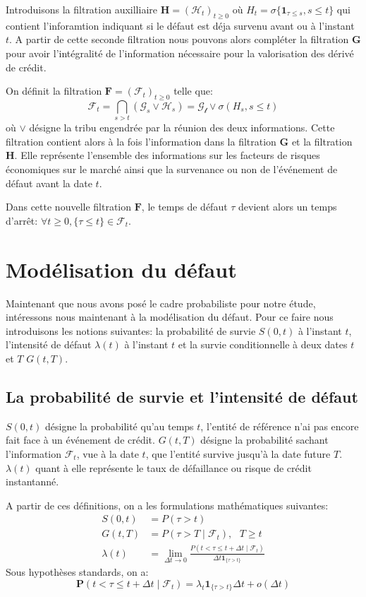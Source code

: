 Introduisons la filtration auxilliaire $\mathbf{H} = (\mathcal{H}_t)_{t \ge 0} \text{ où } H_t = \sigma\{\mathbf{1}_{\tau \le s}, s \le t\}$ qui contient l'inforamtion indiquant si le défaut est déja survenu avant ou à l'instant $t$. A partir de cette seconde filtration nous pouvons alors compléter la filtration $\mathbf{G}$ pour avoir l'intégralité de l'information nécessaire pour la valorisation des dérivé de crédit.


On définit la filtration $\mathbf{F} = (\mathcal{F}_t)_{t \ge 0}$ telle que:
$$\mathcal{F}_t = \bigcap_{s > t} (\mathcal{G}_s \lor \mathcal{H}_s) = \mathcal{G_t} \lor \sigma(H_s, s \le t)$$
où $\lor$ désigne la tribu engendrée par la réunion des deux informations. Cette filtration contient alors à la fois l'information dans la filtration $\mathbf{G}$ et la filtration $\mathbf{H}$. Elle représente l'ensemble des informations sur les facteurs de risques économiques sur le marché ainsi que la survenance ou non de l'événement de défaut avant la date $t$.

Dans cette nouvelle filtration $\mathbf{F}$, le temps de défaut $\tau$ devient alors un temps d'arrêt: $\forall t \ge 0, \{\tau \le t\} \in \mathcal{F}_t$.


\section{Modélisation du défaut}

Maintenant que nous avons posé le cadre probabiliste pour notre étude, intéressons nous maintenant à la modélisation du défaut. Pour ce faire nous introduisons les notions suivantes: la probabilité de survie $S(0, t)$ à l'instant $t$, l'intensité de défaut $\lambda(t)$ à l'instant $t$ et la survie conditionnelle à deux dates $t$ et $T$ $G(t, T)$.


\subsection{La probabilité de survie et l'intensité de défaut}

$S(0, t)$ désigne la probabilité qu'au temps $t$, l'entité de référence n'ai pas encore fait face à un événement de crédit. $G(t, T)$ désigne la probabilité sachant l'information $\mathcal{F}_t$, vue à la date $t$, que l'entité survive jusqu'à la date future $T$. $\lambda(t)$ quant à elle représente le taux de défaillance ou risque de crédit instantanné.

A partir de ces définitions, on a les formulations mathématiques suivantes:
\begin{align*}
    S(0, t) &= P(\tau > t) \\
    G(t, T) &= P(\tau > T \mid \mathcal{F}_t), \text{ } T \ge t \\
    \lambda(t) &= \lim_{\Delta t \rightarrow 0} \frac{P(t < \tau \le t + \Delta t \mid \mathcal{F}_t)}{\Delta t \mathbf{1}_{\{\tau > t\}}}
\end{align*}
Sous hypothèses standards, on a:
\begin{equation}
    \mathbf{P}(t < \tau \le t + \Delta t \mid \mathcal{F}_t) = \lambda_t \mathbf{1}_{\{\tau > t\}} \Delta t + o(\Delta t)
    \label{eq:relation_survie_intensite}
\end{equation}


